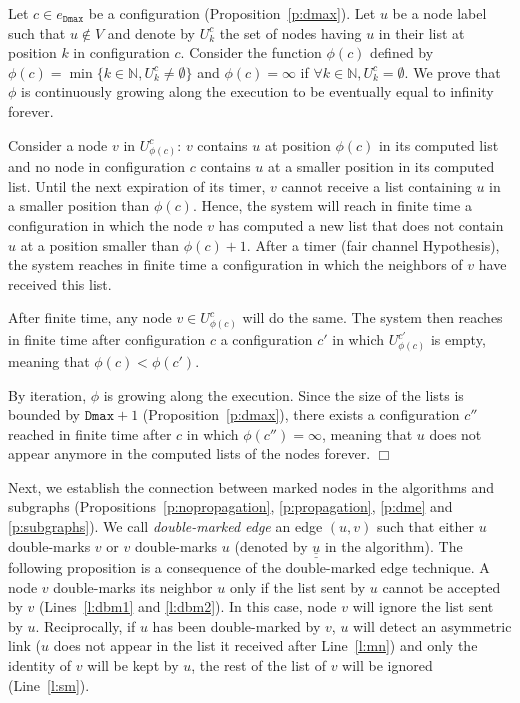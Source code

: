 \documentclass[11pt,english]{article}
\newenvironment{proof}[1][0cm]{
  \begin{list}{\bf Proof.~}{
      \setlength{\itemindent}{0cm}
      \setlength{\labelsep}{0cm}
      \setlength{\labelwidth}{#1}
      \setlength{\leftmargin}{#1}
    \item
    }
}{\hfill$\Box$
  \end{list}
}
\begin{document}
\begin{proof}
Let $c \in e_\texttt{Dmax}$ be a configuration (Proposition~\ref{p:dmax}).
Let $u$ be a node label such that $u \not\in V$ and denote by $U_k^c$ the set of
nodes having $u$ in their list at position $k$ in configuration $c$.  Consider
the function $\phi(c)$ defined by $\phi(c) = \min \{ k\in\mathbb{N}, U_k^c \neq
\emptyset \}$ and $\phi(c) = \infty$ if $\forall k \in \mathbb{N}, U_k^c =
\emptyset$. We prove that $\phi$ is continuously growing along the execution to
be eventually equal to infinity forever.

Consider a node $v$ in $U^{c}_{\phi(c)}$: $v$ contains $u$ at position
$\phi(c)$ in its computed list and no node in configuration $c$ contains $u$
at a smaller position in its computed list. Until the next expiration of its
timer, $v$ cannot receive a list containing $u$ in a smaller position than
$\phi(c)$.
Hence, the system will reach in finite time a configuration in which the node
$v$ has computed a new list that does not contain $u$ at a position smaller than
$\phi(c)+1$. After a timer (fair channel Hypothesis), the system reaches in
finite time a configuration in which the neighbors of $v$ have received this
list.

After finite time, any node $v \in U^{c}_{\phi(c)}$ will do the same. The system
then reaches in finite time after configuration $c$ a configuration $c'$ in
which $U^{c'}_{\phi(c)}$ is empty, meaning that $\phi(c) < \phi(c')$.

By iteration, $\phi$ is growing along the execution.  Since the size of the
lists is bounded by $\texttt{Dmax}+1$ (Proposition~\ref{p:dmax}), there exists a
configuration $c''$ reached in finite time after $c$ in which $\phi(c'') =
\infty$, meaning that $u$ does not appear anymore in the computed lists of the
nodes forever.
\end{proof}




Next, we establish the connection between marked nodes in the algorithms and
subgraphs (Propositions~\ref{p:nopropagation}, \ref{p:propagation}, \ref{p:dme}
and \ref{p:subgraphs}).
We call \emph{double-marked edge} an edge $(u,v)$ such that either $u$
double-marks $v$ or $v$ double-marks $u$ (denoted by $\underline{\underline{u}}$
in the algorithm).  The following proposition is a consequence of the
double-marked edge technique. A node $v$ double-marks its neighbor $u$ only if
the list sent by $u$ cannot be accepted by $v$ (Lines~\ref{l:dbm1} and
\ref{l:dbm2}). In this case, node $v$ will ignore the list sent by
$u$. Reciprocally, if $u$ has been double-marked by $v$, $u$ will detect an
asymmetric link ($u$ does not appear in the list it received after
Line~\ref{l:mn}) and only the identity of $v$ will be kept by $u$, the rest of
the list of $v$ will be ignored (Line~\ref{l:sm}).
\end{document}
